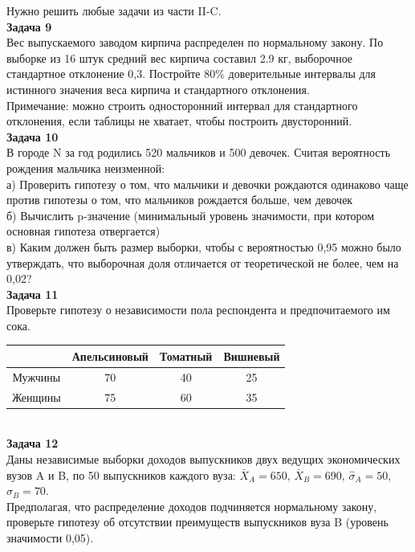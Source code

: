 \documentclass[12pt, a4paper]{article}\usepackage[]{graphicx}\usepackage[]{color}
\begin{document}
	Нужно решить любые \textbf{} задачи из части II-C. \\


	\textbf{Задача 9} \\
	Вес выпускаемого заводом кирпича распределен по нормальному закону. По выборке из 16 штук средний вес кирпича составил 2.9 кг, выборочное стандартное отклонение 0,3. Постройте 80\% доверительные интервалы для истинного значения веса кирпича и стандартного отклонения. \\
	Примечание: можно строить односторонний интервал для стандартного отклонения, если таблицы не хватает, чтобы построить двусторонний. \\

	\textbf{Задача 10} \\
	В городе N за год родились 520 мальчиков и 500 девочек. Считая вероятность рождения мальчика неизменной: \\
	а) Проверить гипотезу о том, что мальчики и девочки рождаются одинаково чаще против гипотезы о том, что мальчиков рождается больше, чем девочек \\
	б) Вычислить p-значение (минимальный уровень значимости, при котором основная гипотеза отвергается) \\
	в) Каким должен быть размер выборки, чтобы с вероятностью 0,95 можно было утверждать, что выборочная доля отличается от теоретической не более, чем на 0,02? \\


	\textbf{Задача 11} \\
	Проверьте гипотезу о независимости пола респондента и предпочитаемого им сока. \\
	\begin{tabular}{|c|c|c|c|}
		\hline
		& Апельсиновый & Томатный & Вишневый  \\
		\hline
		Мужчины & 70 & 40 & 25  \\
		Женщины & 75 & 60 & 35  \\
		\hline
	\end{tabular} \\

	\textbf{Задача 12} \\
	Даны независимые выборки доходов выпускников двух ведущих экономических вузов A и B, по 50 выпускников каждого вуза: $\bar{X}_{A}=650$, $\bar{X}_{B}=690$, $\hat{\sigma}_{A}=50$, $\hat{\sigma}_{B}=70$. \\ Предполагая, что распределение доходов подчиняется нормальному закону, проверьте гипотезу об отсутствии преимуществ выпускников вуза B (уровень значимости 0,05). \\
\end{document}
